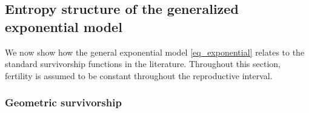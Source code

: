 \documentclass[10pt,a4paper]{amsart}
\theoremstyle{definition}
\theoremstyle{remark}
\numberwithin{equation}{section}
\begin{document}


%
%
%
%
%
%
%

\subsection{Entropy structure of the generalized exponential model}


We now show how the general exponential model 
\eqref{eq_exponential} relates to the standard survivorship functions in the literature. 
Throughout this section, fertility
is assumed to be constant throughout the reproductive interval.
\subsubsection{Geometric survivorship}
\label{subsub_geometric}
\end{document}
